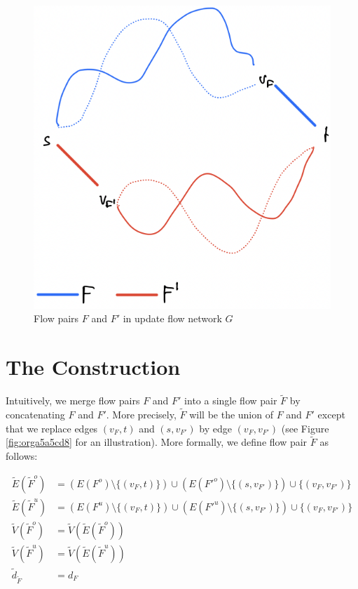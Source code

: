 \documentclass[fontsize=11pt,paper=a4]{book}
\begin{document}
\begin{figure}[htbp]
\centering
\includegraphics[width=.9\linewidth]{../assets/Screen Shot 2023-02-19 at 13.28.41.png}
\caption{\label{fig:org550d5a4}Flow pairs \(F\) and \(F'\) in update flow network \(G\)}
\end{figure}

\section{The Construction}
\label{sec:org92bfb62}

Intuitively, we merge flow pairs \(F\) and \(F'\) into a single flow pair \(\tilde{F}\) by concatenating \(F\) and \(F'\).
More precisely, \(\tilde{F}\) will be the union of \(F\) and \(F'\) except that we replace edges \((v_F,t)\) and \((s,v_{F'})\) by edge \((v_F,v_{F'})\) (see Figure \ref{fig:orga5a5cd8} for an illustration).
More formally, we define flow pair \(\tilde{F}\) as follows:

\begin{align*}
\tilde{E}(\tilde{F}^o)&=\left(E(F^o)\setminus\{(v_F,t)\}\right)\cup\left(E(F'^o)\setminus\{(s,v_{F'})\}\right)\cup\{(v_F,v_{F'})\}\\
\tilde{E}(\tilde{F}^u)&=\left(E(F^u)\setminus\{(v_F,t)\}\right)\cup\left(E(F'^u)\setminus\{(s,v_{F'})\}\right)\cup\{(v_F,v_{F'})\}\\
\tilde{V}(\tilde{F}^o)&=\tilde{V}(\tilde{E}(\tilde{F}^o))\\
\tilde{V}(\tilde{F}^u)&=\tilde{V}(\tilde{E}(\tilde{F}^u))\\
\tilde{d}_{\tilde{F}}&=d_F
\end{align*}
\end{document}
